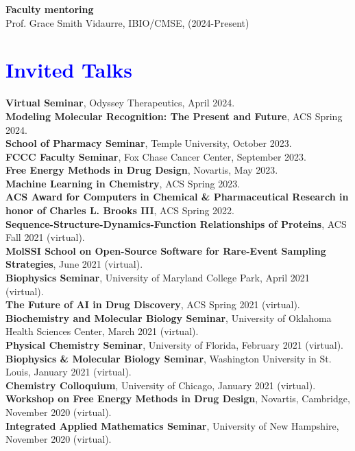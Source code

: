 \documentclass[margin,line]{res}
\begin{document}
\begin{resume}
{\bf Faculty mentoring}\\
Prof. Grace Smith Vidaurre, IBIO/CMSE, (2024-Present)\\

\section{\sc \textcolor{blue}{ Invited Talks }}

{\bf Virtual Seminar}, Odyssey Therapeutics, April 2024.\\
{\bf Modeling Molecular Recognition: The Present and Future}, ACS Spring 2024.\\
{\bf School of Pharmacy Seminar}, Temple University, October 2023. \\
{\bf FCCC Faculty Seminar}, Fox Chase Cancer Center, September 2023. \\
{\bf Free Energy Methods in Drug Design}, Novartis, May 2023. \\
{\bf Machine Learning in Chemistry}, ACS Spring 2023.\\
{\bf ACS Award for Computers in Chemical \& Pharmaceutical Research in honor of Charles L. Brooks III}, ACS Spring 2022.\\
{\bf Sequence-Structure-Dynamics-Function Relationships of Proteins}, ACS Fall 2021 (virtual).\\
{\bf MolSSI School on Open-Source Software for Rare-Event Sampling Strategies}, June 2021 (virtual).\\
{\bf Biophysics Seminar}, University of Maryland College Park, April 2021 (virtual).\\
{\bf The Future of AI in Drug Discovery}, ACS Spring 2021 (virtual).\\
{\bf Biochemistry and Molecular Biology Seminar}, University of Oklahoma Health Sciences Center, March 2021 (virtual).\\
{\bf Physical Chemistry Seminar}, University of Florida, February 2021 (virtual).\\
{\bf Biophysics \& Molecular Biology Seminar}, Washington University in St. Louis, January 2021 (virtual).\\
{\bf Chemistry Colloquium}, University of Chicago, January 2021 (virtual).\\
{\bf Workshop on Free Energy Methods in Drug Design}, Novartis, Cambridge, November 2020 (virtual).\\
{\bf Integrated Applied Mathematics Seminar}, University of New Hampshire, November 2020 (virtual).\\

\end{resume}
\end{document}
